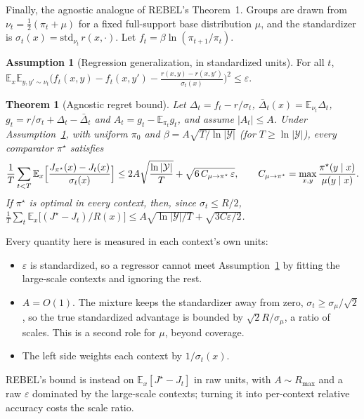 \documentclass[11pt]{article}
\newtheorem{theorem}{Theorem}
\theoremstyle{definition}
\newtheorem{assumption}{Assumption}
\theoremstyle{remark}
\newcommand{\E}{\mathbb{E}}
\newcommand{\cY}{\mathcal{Y}}
\newcommand{\1}{\mathbb{1}}
\begin{document}
Finally, the agnostic analogue of REBEL's Theorem~1. Groups are drawn from
$\nu_t=\frac12(\pi_t+\mu)$ for a fixed full-support base distribution $\mu$, and the
standardizer is $\sigma_t(x)=\mathrm{std}_{\nu_t}\,r(x,\cdot)$. Let
$f_t=\beta\ln(\pi_{t+1}/\pi_t)$.

\begin{assumption}[Regression generalization, in standardized units]\label{ass:reg}
For all $t$,
$\E_x\E_{y,y'\sim\nu_t}\bigl(f_t(x,y)-f_t(x,y')-\frac{r(x,y)-r(x,y')}{\sigma_t(x)}\bigr)^2\le\varepsilon$.
\end{assumption}

\begin{theorem}[Agnostic regret bound]\label{thm:agnostic}
Let $\Delta_t=f_t-r/\sigma_t$, $\bar\Delta_t(x)=\E_{\nu_t}\Delta_t$,
$g_t=r/\sigma_t+\Delta_t-\bar\Delta_t$ and $A_t=g_t-\E_{\pi_t}g_t$, and assume
$|A_t|\le A$. Under Assumption~\ref{ass:reg}, with uniform $\pi_0$ and
$\beta=A\sqrt{T/\ln|\cY|}$ (for $T\ge\ln|\cY|$), every comparator $\pi^\star$ satisfies
\[
  \frac1T\sum_{t<T}\E_x\Bigl[\frac{J_{\pi^\star}(x)-J_t(x)}{\sigma_t(x)}\Bigr]
  \le2A\sqrt{\frac{\ln|\cY|}{T}}+\sqrt{6\,C_{\mu\to\pi^\star}\,\varepsilon},
  \qquad C_{\mu\to\pi^\star}=\max_{x,y}\frac{\pi^\star(y\mid x)}{\mu(y\mid x)}.
\]
If $\pi^\star$ is optimal in every context, then, since $\sigma_t\le R/2$,
$\frac1T\sum_t\E_x\bigl[(J^\star-J_t)/R(x)\bigr]\le A\sqrt{\ln|\cY|/T}+\sqrt{3C\varepsilon/2}$.
\end{theorem}

Every quantity here is measured in each context's own units:
\begin{itemize}[itemsep=1pt,topsep=2pt]
\item $\varepsilon$ is standardized, so a regressor cannot meet Assumption~\ref{ass:reg}
by fitting the large-scale contexts and ignoring the rest.
\item $A=O(1)$. The mixture keeps the standardizer away from zero,
$\sigma_t\ge\sigma_\mu/\sqrt2$, so the true standardized advantage is bounded by
$\sqrt2R/\sigma_\mu$, a ratio of scales. This is a second role for $\mu$, beyond
coverage.
\item The left side weights each context by $1/\sigma_t(x)$.
\end{itemize}
REBEL's bound is instead on $\E_x[J^\star-J_t]$ in raw units, with $A\sim R_{\max}$ and a
raw $\varepsilon$ dominated by the large-scale contexts; turning it into per-context
relative accuracy costs the scale ratio.

\end{document}
